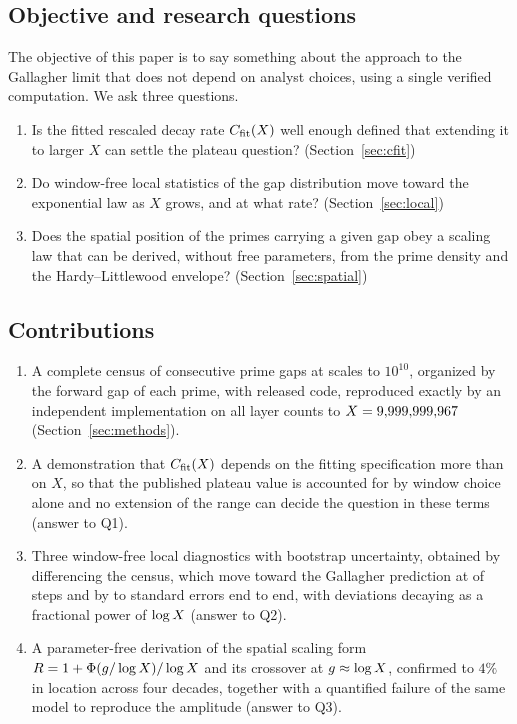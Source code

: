 \documentclass[11pt,a4paper]{article}
\begin{document}
\subsection{Objective and research questions}

The objective of this paper is to say something about the approach to the Gallagher limit that does not depend on analyst choices, using a single verified computation. We ask three questions.

\begin{enumerate}
\item[\textbf{Q1}] Is the fitted rescaled decay rate $C_{\mathrm{fit}}(X)$ well enough defined that extending it to larger $X$ can settle the plateau question? (Section~\ref{sec:cfit})
\item[\textbf{Q2}] Do window-free local statistics of the gap distribution move toward the exponential law as $X$ grows, and at what rate? (Section~\ref{sec:local})
\item[\textbf{Q3}] Does the spatial position of the primes carrying a given gap obey a scaling law that can be derived, without free parameters, from the prime density and the Hardy--Littlewood envelope? (Section~\ref{sec:spatial})
\end{enumerate}

\subsection{Contributions}

\begin{enumerate}
\item A complete census of consecutive prime gaps at \nScales{} scales to $10^{10}$, organized by the forward gap of each prime, with released code, reproduced exactly by an independent implementation on all \verifyLayers{} layer counts to $X=9{,}999{,}999{,}967$ (Section~\ref{sec:methods}).
\item A demonstration that $C_{\mathrm{fit}}(X)$ depends on the fitting specification more than on $X$, so that the published plateau value is accounted for by window choice alone and no extension of the range can decide the question in these terms (answer to Q1).
\item Three window-free local diagnostics with bootstrap uncertainty, obtained by differencing the census, which move toward the Gallagher prediction at \towardEtwo{} of \nSteps{} steps and by \zDEnd{} to \zEtwoEnd{} standard errors end to end, with deviations decaying as a fractional power of $\log X$ (answer to Q2).
\item A parameter-free derivation of the spatial scaling form $R=1+\Phi(g/\log X)/\log X$ and its crossover at $g\approx\log X$, confirmed to $4\%$ in location across four decades, together with a quantified failure of the same model to reproduce the amplitude (answer to Q3).
\end{enumerate}
\end{document}
